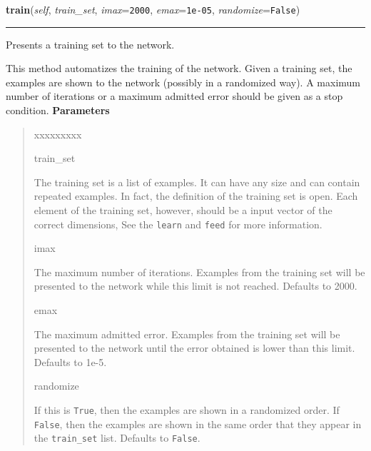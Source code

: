     \label{peach:nn:nnet:SOM:train}

    \vspace{0.5ex}

\hspace{.8\funcindent}\begin{boxedminipage}{\funcwidth}

    \raggedright \textbf{train}(\textit{self}, \textit{train\_set}, \textit{imax}={\tt 2000}, \textit{emax}={\tt 1e-05}, \textit{randomize}={\tt False})

    \vspace{-1.5ex}

    \rule{\textwidth}{0.5\fboxrule}
\setlength{\parskip}{2ex}

Presents a training set to the network.

This method automatizes the training of the network. Given a training
set, the examples are shown to the network (possibly in a randomized
way). A maximum number of iterations or a maximum admitted error should
be given as a stop condition.
\setlength{\parskip}{1ex}
      \textbf{Parameters}
      \vspace{-1ex}

      \begin{quote}
        \begin{Ventry}{xxxxxxxxx}

          \item[train\_set]


The training set is a list of examples. It can have any size and can
contain repeated examples. In fact, the definition of the training
set is open. Each element of the training set, however, should be a
input vector of the correct dimensions, See the \texttt{learn} and
\texttt{feed} for more information.
          \item[imax]


The maximum number of iterations. Examples from the training set
will be presented to the network while this limit is not reached.
Defaults to 2000.
          \item[emax]


The maximum admitted error. Examples from the training set will be
presented to the network until the error obtained is lower than this
limit. Defaults to 1e-5.
          \item[randomize]


If this is \texttt{True}, then the examples are shown in a randomized
order. If \texttt{False}, then the examples are shown in the same order
that they appear in the \texttt{train\_set} list. Defaults to \texttt{False}.
        \end{Ventry}

      \end{quote}

    \end{boxedminipage}


